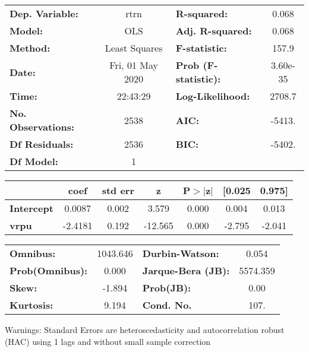 \begin{center}
\begin{tabular}{lclc}
\toprule
\textbf{Dep. Variable:}    &       rtrn       & \textbf{  R-squared:         } &     0.068   \\
\textbf{Model:}            &       OLS        & \textbf{  Adj. R-squared:    } &     0.068   \\
\textbf{Method:}           &  Least Squares   & \textbf{  F-statistic:       } &     157.9   \\
\textbf{Date:}             & Fri, 01 May 2020 & \textbf{  Prob (F-statistic):} &  3.60e-35   \\
\textbf{Time:}             &     22:43:29     & \textbf{  Log-Likelihood:    } &    2708.7   \\
\textbf{No. Observations:} &        2538      & \textbf{  AIC:               } &    -5413.   \\
\textbf{Df Residuals:}     &        2536      & \textbf{  BIC:               } &    -5402.   \\
\textbf{Df Model:}         &           1      & \textbf{                     } &             \\
\bottomrule
\end{tabular}
\begin{tabular}{lcccccc}
                   & \textbf{coef} & \textbf{std err} & \textbf{z} & \textbf{P$> |$z$|$} & \textbf{[0.025} & \textbf{0.975]}  \\
\midrule
\textbf{Intercept} &       0.0087  &        0.002     &     3.579  &         0.000        &        0.004    &        0.013     \\
\textbf{vrpu}      &      -2.4181  &        0.192     &   -12.565  &         0.000        &       -2.795    &       -2.041     \\
\bottomrule
\end{tabular}
\begin{tabular}{lclc}
\textbf{Omnibus:}       & 1043.646 & \textbf{  Durbin-Watson:     } &    0.054  \\
\textbf{Prob(Omnibus):} &   0.000  & \textbf{  Jarque-Bera (JB):  } & 5574.359  \\
\textbf{Skew:}          &  -1.894  & \textbf{  Prob(JB):          } &     0.00  \\
\textbf{Kurtosis:}      &   9.194  & \textbf{  Cond. No.          } &     107.  \\
\bottomrule
\end{tabular}
\end{center}

Warnings: \newline
 [1] Standard Errors are heteroscedasticity and autocorrelation robust (HAC) using 1 lags and without small sample correction